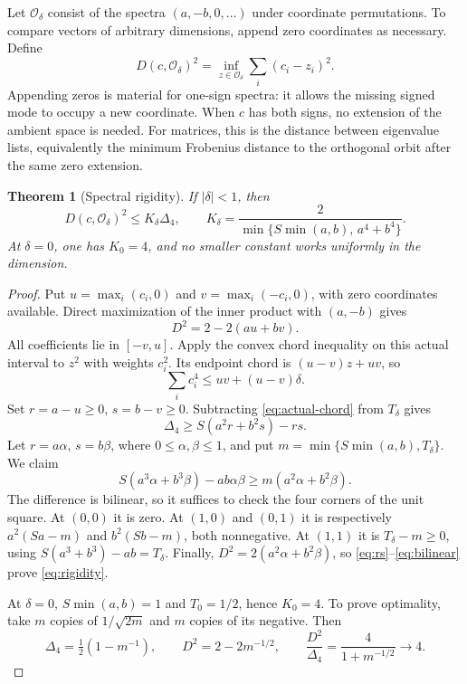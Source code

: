 \documentclass[11pt]{article}
\numberwithin{equation}{section}
\newtheorem{theorem}{Theorem}[section]
\theoremstyle{definition}
\theoremstyle{remark}
\newcommand{\gapfour}{\Delta_4}
\begin{document}
Let $\mathcal O_\delta$ consist of the spectra $(a,-b,0,\ldots)$ under coordinate permutations. To compare vectors of arbitrary dimensions, append zero coordinates as necessary. Define
\begin{equation}\label{eq:distance}
D(c,\mathcal O_\delta)^2
=\inf_{z\in\mathcal O_\delta}\sum_i(c_i-z_i)^2.
\end{equation}
Appending zeros is material for one-sign spectra: it allows the missing signed mode to occupy a new coordinate. When $c$ has both signs, no extension of the ambient space is needed. For matrices, this is the distance between eigenvalue lists, equivalently the minimum Frobenius distance to the orthogonal orbit after the same zero extension.

\begin{theorem}[Spectral rigidity]\label{thm:rigidity}
If $|\delta|<1$, then
\begin{equation}\label{eq:rigidity}
D(c,\mathcal O_\delta)^2\leq K_\delta\gapfour,
\qquad
K_\delta=\frac{2}{\min\{S\min(a,b),\,a^4+b^4\}}.
\end{equation}
At $\delta=0$, one has $K_0=4$, and no smaller constant works uniformly in the dimension.
\end{theorem}

\begin{proof}
Put $u=\max_i(c_i,0)$ and $v=\max_i(-c_i,0)$, with zero coordinates available. Direct maximization of the inner product with $(a,-b)$ gives
\begin{equation}\label{eq:Duv}
D^2=2-2(au+bv).
\end{equation}
All coefficients lie in $[-v,u]$. Apply the convex chord inequality on this actual interval to $z^2$ with weights $c_i^2$. Its endpoint chord is $(u-v)z+uv$, so
\begin{equation}\label{eq:actual-chord}
\sum_i c_i^4\leq uv+(u-v)\delta.
\end{equation}
Set $r=a-u\geq0$, $s=b-v\geq0$. Subtracting \eqref{eq:actual-chord} from $T_\delta$ gives
\begin{equation}\label{eq:rs}
\gapfour\geq S(a^2r+b^2s)-rs.
\end{equation}
Let $r=a\alpha$, $s=b\beta$, where $0\leq\alpha,\beta\leq1$, and put
$m=\min\{S\min(a,b),T_\delta\}$. We claim
\begin{equation}\label{eq:bilinear}
S(a^3\alpha+b^3\beta)-ab\alpha\beta
\geq m(a^2\alpha+b^2\beta).
\end{equation}
The difference is bilinear, so it suffices to check the four corners of the unit square. At $(0,0)$ it is zero. At $(1,0)$ and $(0,1)$ it is respectively $a^2(Sa-m)$ and $b^2(Sb-m)$, both nonnegative. At $(1,1)$ it is $T_\delta-m\geq0$, using $S(a^3+b^3)-ab=T_\delta$. Finally, $D^2=2(a^2\alpha+b^2\beta)$, so \eqref{eq:rs}--\eqref{eq:bilinear} prove \eqref{eq:rigidity}.

At $\delta=0$, $S\min(a,b)=1$ and $T_0=1/2$, hence $K_0=4$. To prove optimality, take $m$ copies of $1/\sqrt{2m}$ and $m$ copies of its negative. Then
\[
\gapfour=\tfrac12(1-m^{-1}),\qquad
D^2=2-2m^{-1/2},\qquad
\frac{D^2}{\gapfour}=\frac4{1+m^{-1/2}}\longrightarrow4.
\]
\end{proof}
\end{document}
